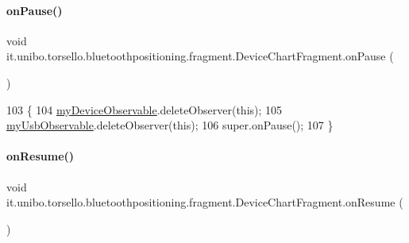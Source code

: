 \paragraph{\texorpdfstring{on\+Pause()}{onPause()}}
{\footnotesize\ttfamily void it.\+unibo.\+torsello.\+bluetoothpositioning.\+fragment.\+Device\+Chart\+Fragment.\+on\+Pause (\begin{DoxyParamCaption}{ }\end{DoxyParamCaption})}


\begin{DoxyCode}
103                           \{
104         \hyperlink{classit_1_1unibo_1_1torsello_1_1bluetoothpositioning_1_1fragment_1_1DeviceChartFragment_a82756c59ac344db249e6cebcec3d1835_a82756c59ac344db249e6cebcec3d1835}{myDeviceObservable}.deleteObserver(\textcolor{keyword}{this});
105         \hyperlink{classit_1_1unibo_1_1torsello_1_1bluetoothpositioning_1_1fragment_1_1DeviceChartFragment_aa9e0527dce7ccc3e51afe698a76f2faf_aa9e0527dce7ccc3e51afe698a76f2faf}{myUsbObservable}.deleteObserver(\textcolor{keyword}{this});
106         super.onPause();
107     \}
\end{DoxyCode}
\hypertarget{classit_1_1unibo_1_1torsello_1_1bluetoothpositioning_1_1fragment_1_1DeviceChartFragment_a039e605be958cf11403bc1358bfd70c0_a039e605be958cf11403bc1358bfd70c0}{}\label{classit_1_1unibo_1_1torsello_1_1bluetoothpositioning_1_1fragment_1_1DeviceChartFragment_a039e605be958cf11403bc1358bfd70c0_a039e605be958cf11403bc1358bfd70c0} 
\paragraph{\texorpdfstring{on\+Resume()}{onResume()}}
{\footnotesize\ttfamily void it.\+unibo.\+torsello.\+bluetoothpositioning.\+fragment.\+Device\+Chart\+Fragment.\+on\+Resume (\begin{DoxyParamCaption}{ }\end{DoxyParamCaption})}


